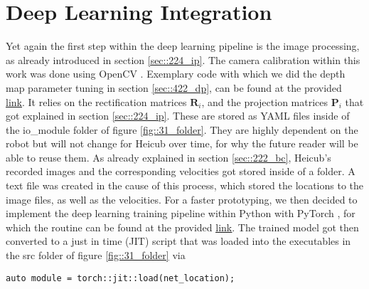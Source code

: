 \FloatBarrier
\section{Deep Learning Integration}
\label{sec::33_dl}
Yet again the first step within the deep learning pipeline is the image processing, as already introduced in section  \ref{sec::224_ip}. The camera calibration within this work was done using OpenCV \cite{opencv_library}. Exemplary code with which we did the depth map parameter tuning in section \ref{sec::422_dp}, can be found at the provided \href{https://github.com/mhubii/nmpc_pattern_generator/blob/master/src/tune_disp_map.cpp}{\underline{link}}. It relies on the rectification matrices $\bm{R}_i$, and the projection matrices $\bm{P}_i$ that got explained in section \ref{sec::224_ip}. These are stored as YAML files inside of the io\_module folder of figure \ref{fig::31_folder}. They are highly dependent on the robot but will not change for Heicub over time, for why the future reader will be able to reuse them. As already explained in section \ref{sec::222_bc}, Heicub's recorded images and the corresponding velocities got stored inside of a folder. A text file was created in the cause of this process, which stored the locations to the image files, as well as the velocities. For a faster prototyping, we then decided to implement the deep learning training pipeline within Python with PyTorch \cite{paszke2017automatic}, for which the routine can be found at the provided \href{https://github.com/mhubii/nmpc_pattern_generator/blob/master/libs/learning/python/train_rgbd.py}{\underline{link}}. The trained model got then converted to a just in time (JIT) script that was loaded into the executables in the src folder of figure \ref{fig::31_folder} via
\begin{verbatim}
auto module = torch::jit::load(net_location);
\end{verbatim}
